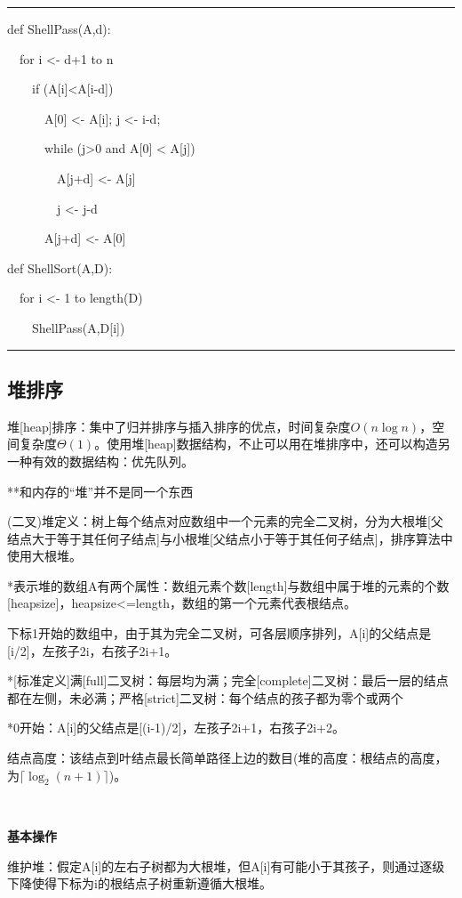 \documentclass[a4paper,UTF8,fontset=windows]{ctexart}
\newenvironment{code}{\rule{36em}{0.1em}\setlength{\parindent}{1em}

}{

\setlength{\parindent}{0em}\rule{36em}{0.1em}}
\begin{document}
\begin{code}
def ShellPass(A,d):

\ \ for i <- d+1 to n

\ \ \ \ if (A[i]<A[i-d])

\ \ \ \ \ \ A[0] <- A[i]; j <- i-d;

\ \ \ \ \ \ while (j>0 and A[0] < A[j])

\ \ \ \ \ \ \ \ A[j+d] <- A[j]

\ \ \ \ \ \ \ \ j <- j-d

\ \ \ \ \ \ A[j+d] <- A[0]

def ShellSort(A,D):

\ \ for i <- 1 to length(D)

\ \ \ \ ShellPass(A,D[i])
\end{code}

\subsection{堆排序}

堆[heap]排序：集中了归并排序与插入排序的优点，时间复杂度$O(n\log n)$，空间复杂度$\Theta(1)$。使用堆[heap]数据结构，不止可以用在堆排序中，还可以构造另一种有效的数据结构：优先队列。

**\hspace{0em}和内存的“堆”并不是同一个东西

(二叉)堆定义：树上每个结点对应数组中一个元素的完全二叉树，分为大根堆[父结点大于等于其任何子结点]与小根堆[父结点小于等于其任何子结点]，排序算法中使用大根堆。

*\hspace{0em}表示堆的数组A有两个属性：数组元素个数[length]与数组中属于堆的元素的个数[heapsize]，heapsize<=length，数组的第一个元素代表根结点。

下标1开始的数组中，由于其为完全二叉树，可各层顺序排列，A[i]的父结点是[i/2]，左孩子2i，右孩子2i+1。

*[标准定义]满[full]二叉树：每层均为满；完全[complete]二叉树：最后一层的结点都在左侧，未必满；严格[strict]二叉树：每个结点的孩子都为零个或两个

*0开始：A[i]的父结点是[(i-1)/2]，左孩子2i+1，右孩子2i+2。

结点高度：该结点到叶结点最长简单路径上边的数目(堆的高度：根结点的高度，为$\lceil\log_2(n+1)\rceil$)。

\

\textbf{基本操作}

维护堆：假定A[i]的左右子树都为大根堆，但A[i]有可能小于其孩子，则通过逐级下降使得下标为i的根结点子树重新遵循大根堆。
\end{document}
